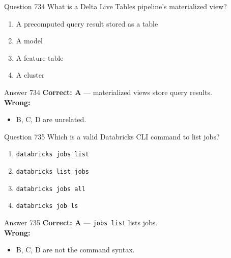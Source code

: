 \documentclass[aspectratio=169,11pt]{beamer}
\begin{document}
	\begin{frame}{Question 734}
		What is a Delta Live Tables pipeline's materialized view?
		\begin{enumerate}[label=\Alph*.]
			\item A precomputed query result stored as a table
			\item A model
			\item A feature table
			\item A cluster
		\end{enumerate}
	\end{frame}
	\begin{frame}{Answer 734}
		\textbf{Correct: A} --- materialized views store query results.\\
		\vspace{0.5em}
		\textbf{Wrong:}
		\begin{itemize}
			\item B, C, D are unrelated.
		\end{itemize}
	\end{frame}
	
	\begin{frame}{Question 735}
		Which is a valid Databricks CLI command to list jobs?
		\begin{enumerate}[label=\Alph*.]
			\item \texttt{databricks jobs list}
			\item \texttt{databricks list jobs}
			\item \texttt{databricks jobs all}
			\item \texttt{databricks job ls}
		\end{enumerate}
	\end{frame}
	\begin{frame}{Answer 735}
		\textbf{Correct: A} --- \texttt{jobs list} lists jobs.\\
		\vspace{0.5em}
		\textbf{Wrong:}
		\begin{itemize}
			\item B, C, D are not the command syntax.
		\end{itemize}
	\end{frame}
	
\end{document}
